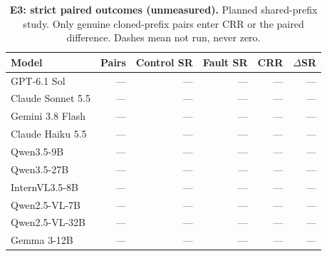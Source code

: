 \begin{table}[!ht]
\centering\small
\caption{\textbf{E3: strict paired outcomes (unmeasured).} Planned shared-prefix study. Only genuine cloned-prefix pairs enter CRR or the paired difference. Dashes mean not run, never zero.}
\begin{tabularx}{\textwidth}{@{}Xrrrrr@{}}\toprule
Model & Pairs & Control SR & Fault SR & CRR & $\Delta$SR\\\midrule
GPT-6.1 Sol & --- & --- & --- & --- & ---\\
Claude Sonnet 5.5 & --- & --- & --- & --- & ---\\
Gemini 3.8 Flash & --- & --- & --- & --- & ---\\
Claude Haiku 5.5 & --- & --- & --- & --- & ---\\
Qwen3.5-9B & --- & --- & --- & --- & ---\\
Qwen3.5-27B & --- & --- & --- & --- & ---\\
InternVL3.5-8B & --- & --- & --- & --- & ---\\
Qwen2.5-VL-7B & --- & --- & --- & --- & ---\\
Qwen2.5-VL-32B & --- & --- & --- & --- & ---\\
Gemma 3-12B & --- & --- & --- & --- & ---\\
\bottomrule
\end{tabularx}
\end{table}
